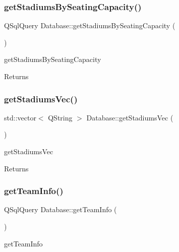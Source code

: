 \subsubsection{\texorpdfstring{get\+Stadiums\+By\+Seating\+Capacity()}{getStadiumsBySeatingCapacity()}}
{\footnotesize\ttfamily Q\+Sql\+Query Database\+::get\+Stadiums\+By\+Seating\+Capacity (\begin{DoxyParamCaption}{ }\end{DoxyParamCaption})}



get\+Stadiums\+By\+Seating\+Capacity 

\begin{DoxyReturn}{Returns}

\end{DoxyReturn}
\mbox{\label{class_database_a40f0c2887aca4a26932b11155315dcd8}} 
\subsubsection{\texorpdfstring{get\+Stadiums\+Vec()}{getStadiumsVec()}}
{\footnotesize\ttfamily std\+::vector$<$ Q\+String $>$ Database\+::get\+Stadiums\+Vec (\begin{DoxyParamCaption}{ }\end{DoxyParamCaption})}



get\+Stadiums\+Vec 

\begin{DoxyReturn}{Returns}

\end{DoxyReturn}
\mbox{\label{class_database_a7d66de82867475afd95ba8a29fc694fe}} 
\subsubsection{\texorpdfstring{get\+Team\+Info()}{getTeamInfo()}}
{\footnotesize\ttfamily Q\+Sql\+Query Database\+::get\+Team\+Info (\begin{DoxyParamCaption}{ }\end{DoxyParamCaption})}



get\+Team\+Info 

